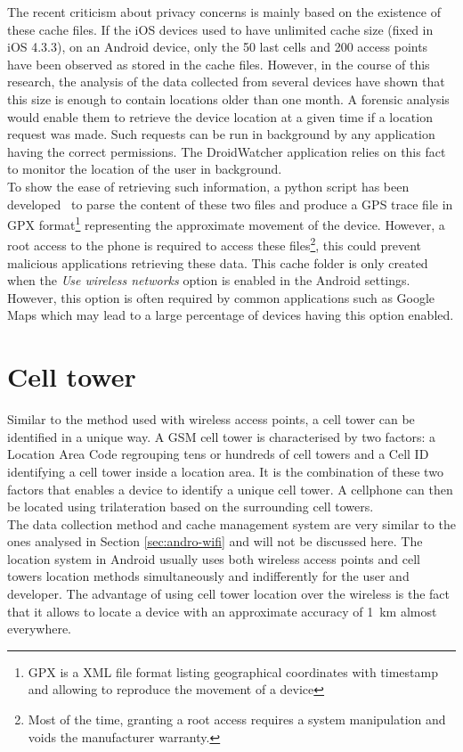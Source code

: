 The recent criticism about privacy concerns is mainly based on the existence of these cache files.
If the iOS devices used to have unlimited cache size (fixed in iOS 4.3.3), on an Android device, only the 50 last cells and 200 access points have been observed as stored in the cache files.
However, in the course of this research, the analysis of the data collected from several devices have shown that this size is enough to contain locations older than one month.
A forensic analysis would enable them to retrieve the device location at a given time if a location request was made.
Such requests can be run in background by any application having the correct permissions.
The DroidWatcher application relies on this fact to monitor the location of the user in background.\\

To show the ease of retrieving such information, a python script has been developed~\cite{soft-locdump} to parse the content of these two files and produce a GPS trace file in GPX format\footnote{GPX is a XML file format listing geographical coordinates with timestamp and allowing to reproduce the movement of a device} representing the approximate movement of the device.
However, a root access to the phone is required to access these files\footnote{Most of the time, granting a root access requires a system manipulation and voids the manufacturer warranty.}, this could prevent malicious applications retrieving these data.
This cache folder is only created when the \emph{Use wireless networks} option is enabled in the Android settings.
However, this option is often required by common applications such as Google Maps which may lead to a large percentage of devices having this option enabled.

\section{Cell tower}
\label{sec:loc-cell-tower}
Similar to the method used with wireless access points, a cell tower can be identified in a unique way.
A GSM cell tower is characterised by two factors: a Location Area Code regrouping tens or hundreds of cell towers and a Cell ID identifying a cell tower inside a location area.
It is the combination of these two factors that enables a device to identify a unique cell tower.
A cellphone can then be located using trilateration based on the surrounding cell towers.\\

The data collection method and cache management system are very similar to the ones analysed in Section \ref{sec:andro-wifi} and will not be discussed here.
The location system in Android usually uses both wireless access points and cell towers location methods simultaneously and indifferently for the user and developer.
The advantage of using cell tower location over the wireless is the fact that it allows to locate a device with an approximate accuracy of 1~km almost everywhere.

